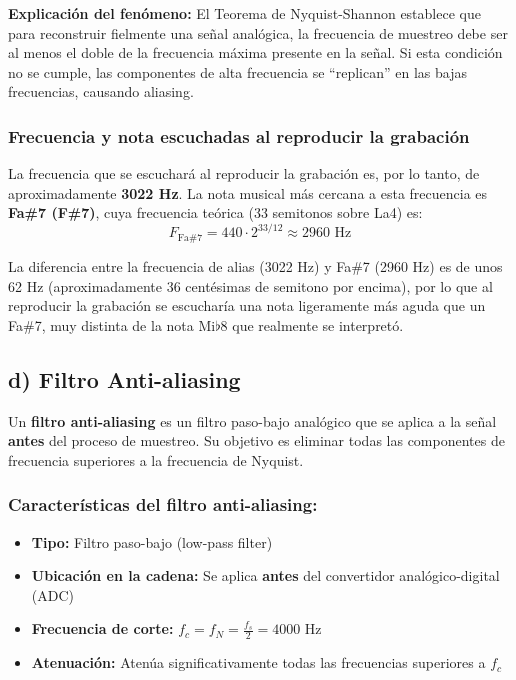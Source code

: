 \documentclass[12pt]{article}
\begin{document}
\textbf{Explicación del fenómeno:} El Teorema de Nyquist-Shannon establece que para reconstruir fielmente una señal analógica, la frecuencia de muestreo debe ser al menos el doble de la frecuencia máxima presente en la señal. Si esta condición no se cumple, las componentes de alta frecuencia se ``replican'' en las bajas frecuencias, causando aliasing.

\subsubsection*{Frecuencia y nota escuchadas al reproducir la grabación}

La frecuencia que se escuchará al reproducir la grabación es, por lo tanto, de aproximadamente \textbf{3022 Hz}. La nota musical más cercana a esta frecuencia es \textbf{Fa\#7 (F\#7)}, cuya frecuencia teórica (33 semitonos sobre La4) es:
\[
F_{\text{Fa\#7}} = 440 \cdot 2^{33/12} \approx 2960 \text{ Hz}
\]

La diferencia entre la frecuencia de alias (3022 Hz) y Fa\#7 (2960 Hz) es de unos 62 Hz (aproximadamente 36 centésimas de semitono por encima), por lo que al reproducir la grabación se escucharía una nota ligeramente más aguda que un Fa\#7, muy distinta de la nota Mi\(\flat\)8 que realmente se interpretó.

\subsection*{d) Filtro Anti-aliasing}
 
Un \textbf{filtro anti-aliasing} es un filtro paso-bajo analógico que se aplica a la señal \textbf{antes} del proceso de muestreo. Su objetivo es eliminar todas las componentes de frecuencia superiores a la frecuencia de Nyquist.
 
\subsubsection*{Características del filtro anti-aliasing:}
 
\begin{itemize}
    \item \textbf{Tipo:} Filtro paso-bajo (low-pass filter)
    \item \textbf{Ubicación en la cadena:} Se aplica \textbf{antes} del convertidor analógico-digital (ADC)
    \item \textbf{Frecuencia de corte:} \(f_c = f_N = \frac{f_s}{2} = 4000 \text{ Hz}\)
    \item \textbf{Atenuación:} Atenúa significativamente todas las frecuencias superiores a \(f_c\)
\end{itemize}
 
\end{document}
